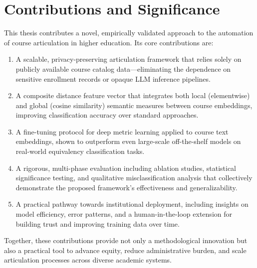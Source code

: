 \section{Contributions and Significance}
This thesis contributes a novel, empirically validated approach to the automation of course articulation in higher education. Its core contributions are:
\begin{enumerate}
    \item A scalable, privacy-preserving articulation framework that relies solely on publicly available course catalog data—eliminating the dependence on sensitive enrollment records or opaque LLM inference pipelines.
    \item A composite distance feature vector that integrates both local (elementwise) and global (cosine similarity) semantic measures between course embeddings, improving classification accuracy over standard approaches.
    \item A fine-tuning protocol for deep metric learning applied to course text embeddings, shown to outperform even large-scale off-the-shelf models on real-world equivalency classification tasks.
    \item A rigorous, multi-phase evaluation including ablation studies, statistical significance testing, and qualitative misclassification analysis that collectively demonstrate the proposed framework's effectiveness and generalizability.
    \item A practical pathway towards institutional deployment, including insights on model efficiency, error patterns, and a human-in-the-loop extension for building trust and improving training data over time.
\end{enumerate}
Together, these contributions provide not only a methodological innovation but also a practical tool to advance equity, reduce administrative burden, and scale articulation processes across diverse academic systems.